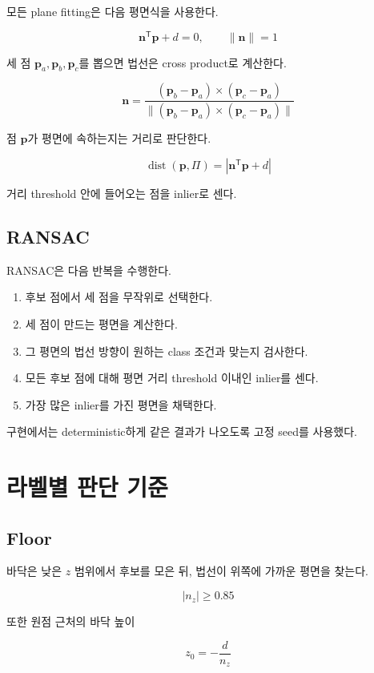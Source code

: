 \documentclass[11pt,a4paper,oneside]{report}
\begin{document}
모든 plane fitting은 다음 평면식을 사용한다.

\[
\mathbf{n}^{\mathsf{T}}\mathbf{p} + d = 0,
\qquad
\|\mathbf{n}\| = 1
\]

세 점 $\mathbf{p}_a,\mathbf{p}_b,\mathbf{p}_c$를 뽑으면 법선은 cross product로 계산한다.

\[
\mathbf{n}
= \frac{(\mathbf{p}_b-\mathbf{p}_a) \times (\mathbf{p}_c-\mathbf{p}_a)}
       {\|(\mathbf{p}_b-\mathbf{p}_a) \times (\mathbf{p}_c-\mathbf{p}_a)\|}
\]

점 $\mathbf{p}$가 평면에 속하는지는 거리로 판단한다.

\[
\operatorname{dist}(\mathbf{p}, \Pi)
= |\mathbf{n}^{\mathsf{T}}\mathbf{p} + d|
\]

거리 threshold 안에 들어오는 점을 inlier로 센다.

\section{RANSAC}

RANSAC은 다음 반복을 수행한다.

\begin{enumerate}[leftmargin=2em]
\item 후보 점에서 세 점을 무작위로 선택한다.
\item 세 점이 만드는 평면을 계산한다.
\item 그 평면의 법선 방향이 원하는 class 조건과 맞는지 검사한다.
\item 모든 후보 점에 대해 평면 거리 threshold 이내인 inlier를 센다.
\item 가장 많은 inlier를 가진 평면을 채택한다.
\end{enumerate}

구현에서는 deterministic하게 같은 결과가 나오도록 고정 seed를 사용했다.

\chapter{라벨별 판단 기준}

\section{Floor}

바닥은 낮은 $z$ 범위에서 후보를 모은 뒤, 법선이 위쪽에 가까운 평면을 찾는다.

\[
|n_z| \ge 0.85
\]

또한 원점 근처의 바닥 높이

\[
z_0 = -\frac{d}{n_z}
\]
\end{document}
